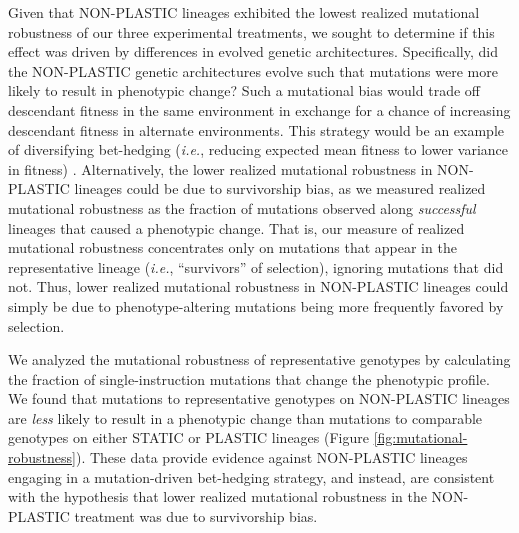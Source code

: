 \documentclass[utf8]{frontiersSCNS} %
\begin{document}
\begin{raggedbottom}
Given that NON-PLASTIC lineages exhibited the lowest realized mutational robustness of our three experimental treatments, we sought to determine if this effect was driven by differences in evolved genetic architectures.
Specifically, did the NON-PLASTIC genetic architectures evolve such that mutations were more likely to result in phenotypic change?
Such a mutational bias would trade off descendant fitness in the same environment in exchange for a chance of increasing descendant fitness in alternate environments.
This strategy would be an example of diversifying bet-hedging (\textit{i.e.}, reducing expected mean fitness to lower variance in fitness) \citep{childs2010evolutionary}.
Alternatively, the lower realized mutational robustness in NON-PLASTIC lineages could be due to survivorship bias, as we measured realized mutational robustness as the fraction of mutations observed along \textit{successful} lineages that caused a phenotypic change.
That is, our measure of realized mutational robustness concentrates only on mutations that appear in the representative lineage (\textit{i.e.}, ``survivors'' of selection), ignoring mutations that did not. 
Thus, lower realized mutational robustness in NON-PLASTIC lineages could simply be due to phenotype-altering mutations being more frequently favored by selection.


We analyzed the mutational robustness of representative genotypes by calculating the fraction of single-instruction mutations that change the phenotypic profile.
We found that mutations to representative genotypes on NON-PLASTIC lineages are \textit{less} likely to result in a phenotypic change than mutations to comparable genotypes on either STATIC or PLASTIC lineages (Figure \ref{fig:mutational-robustness}).
These data provide evidence against NON-PLASTIC lineages engaging in a mutation-driven bet-hedging strategy, and instead, are consistent with the hypothesis that lower realized mutational robustness in the NON-PLASTIC treatment was due to survivorship bias.


\end{raggedbottom}
\end{document}
